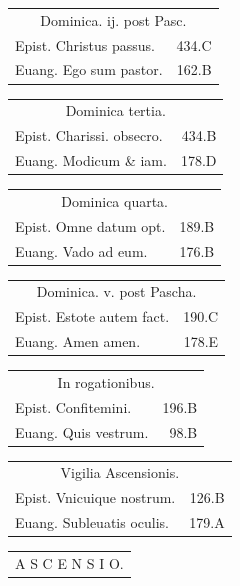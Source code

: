 \documentclass[a5paper,10pt]{book}
\begin{document}
\begin{multicols}{2}
\begin{tabular}{l r}
\end{tabular}
\begin{tabular}{l r}
\multicolumn{2}{c}{\color{red} Dominica. ij. post Pasc.}\\
Epist. Christus passus. & 434.C\\
Euang. Ego sum pastor. & 162.B\\
\end{tabular}
\begin{tabular}{l r}
\multicolumn{2}{c}{\color{red} Dominica tertia.}\\
Epist. Charissi. obsecro. & 434.B\\
Euang. Modicum \& iam. & 178.D\\
\end{tabular}
\begin{tabular}{l r}
\multicolumn{2}{c}{\color{red} Dominica quarta.}\\
Epist. Omne datum opt. & 189.B\\
Euang. Vado ad eum. & 176.B\\
\end{tabular}
\begin{tabular}{l r}
\multicolumn{2}{c}{\color{red} Dominica. v. post Pascha.}\\
Epist. Estote autem fact. & 190.C\\
Euang. Amen amen. & 178.E\\
\end{tabular}
\begin{tabular}{l r}
\multicolumn{2}{c}{\color{red} In rogationibus.}\\
Epist. Confitemini. & 196.B\\
Euang. Quis vestrum. & 98.B\\
\end{tabular}
\begin{tabular}{l r}
\multicolumn{2}{c}{\color{red} Vigilia Ascensionis.}\\
Epist. Vnicuique nostrum. & 126.B\\
Euang. Subleuatis oculis. & 179.A\\
\end{tabular}
\par
\begin{tabular}{c}
\color{red} \large A S C E N S I O.\\
\end{tabular}
\par
\begin{tabular}{l r}

\end{tabular}
\end{multicols}
\end{document}
